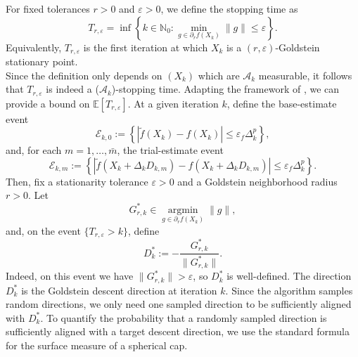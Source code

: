 \documentclass[11pt,a4paper]{article}
\newcommand{\me}{\mathbb{E}}
\newcommand{\Dexp}{p}
\newcommand{\goldelta}{r}
\DeclareMathOperator{\argmin}{argmin}
\newcommand{\Xk}{X_k}
\begin{document}
For fixed tolerances $\goldelta>0$ and $\varepsilon>0$, we define the stopping time as
\begin{equation}\label{Teps}
    T_{\goldelta, \varepsilon} = \inf\left\{ k \in \mathbb{N}_0 : \min_{g \in \partial_\goldelta f(\Xk)} \|g\| \leq \varepsilon \right\}.
\end{equation}
Equivalently, \(T_{\goldelta,\varepsilon}\) is the first iteration at which
\(X_k\) is a \((\goldelta,\varepsilon)\)-Goldstein stationary point.\\
Since the definition only depends on \((\Xk)\) which are $\mathcal A_{k}$ measurable, it follows that $T_{\goldelta, \varepsilon}$ is indeed a ($\mathcal A_k$)-stopping time. Adapting the framework of \cite{MR4151319}, we can provide a bound on $\me[T_{\goldelta, \varepsilon}]$. At a given iteration \(k\), define the base-estimate event
\[
\mathcal E_{k,0}
:=
\left\{
    |\tilde f(X_k)-f(X_k)|
    \le
    \varepsilon_f\Delta_k^{\Dexp}
\right\},
\]
and, for each \(m=1,\ldots,\bar{m}\), the trial-estimate event
\[
\mathcal E_{k,m}
:=
\left\{
    |\tilde f(X_k+\Delta_kD_{k,m})
      -f(X_k+\Delta_kD_{k,m})|
    \le
    \varepsilon_f\Delta_k^{\Dexp}
\right\}.
\]
Then, fix a stationarity tolerance
\(\varepsilon>0\) and a Goldstein neighborhood radius \(\goldelta>0\).
Let
\[
    G_{\goldelta,k}^*
    \in
    \operatorname*{argmin}_{g\in\partial_{\goldelta}f(X_k)}\|g\|,
\]
and, on the event \(\{T_{\goldelta,\varepsilon}>k\}\), define
\[
    D_k^*
    :=
    -\frac{G_{\goldelta,k}^*}{\|G_{\goldelta,k}^*\|}.
\]
Indeed, on this event we have \(\|G_{\goldelta,k}^*\|>\varepsilon\), so
\(D_k^*\) is well-defined. The direction \(D_k^*\) is the Goldstein descent direction at iteration $k$. Since the algorithm
samples random directions, we only need one sampled direction to be sufficiently
aligned with \(D_k^*\). To quantify the probability that a randomly sampled direction is sufficiently
aligned with a target descent direction, we use the standard formula for the
surface measure of a spherical cap. 
\end{document}
